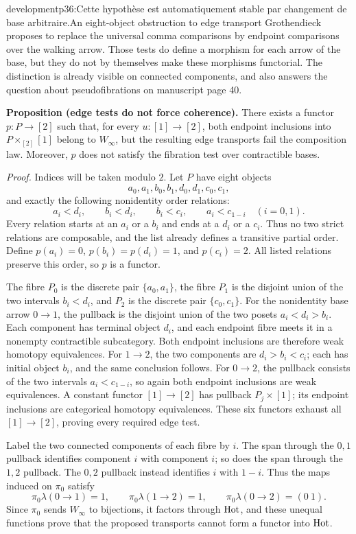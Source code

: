 \begin{dcomment}{development}{p36:Cette hypothèse est automatiquement stable par changement de base arbitraire.}{An eight-object obstruction to edge transport}
Grothendieck proposes to replace the universal comma comparisons by endpoint comparisons over the walking arrow. Those tests do define a morphism for each arrow of the base, but they do not by themselves make these morphisms functorial. The distinction is already visible on connected components, and also answers the question about pseudofibrations on manuscript page 40.

\textbf{Proposition (edge tests do not force coherence).}\ours
There exists a functor $p:P\to[2]$ such that, for every $u:[1]\to[2]$, both endpoint inclusions into $P\times_{[2]}[1]$ belong to $W_\infty$, but the resulting edge transports fail the composition law. Moreover, $p$ does not satisfy the fibration test over contractible bases.

\emph{Proof.} Indices will be taken modulo $2$. Let $P$ have eight objects
\[
 a_0,a_1,b_0,b_1,d_0,d_1,c_0,c_1,
\]
and exactly the following nonidentity order relations:
\[
 a_i<d_i,\qquad b_i<d_i,\qquad
 b_i<c_i,\qquad a_i<c_{1-i}\quad(i=0,1).
\]
Every relation starts at an $a_i$ or a $b_i$ and ends at a $d_i$ or a $c_i$. Thus no two strict relations are composable, and the list already defines a transitive partial order. Define $p(a_i)=0$, $p(b_i)=p(d_i)=1$, and $p(c_i)=2$. All listed relations preserve this order, so $p$ is a functor.

The fibre $P_0$ is the discrete pair $\{a_0,a_1\}$, the fibre $P_1$ is the disjoint union of the two intervals $b_i<d_i$, and $P_2$ is the discrete pair $\{c_0,c_1\}$. For the nonidentity base arrow $0\to1$, the pullback is the disjoint union of the two posets $a_i<d_i>b_i$. Each component has terminal object $d_i$, and each endpoint fibre meets it in a nonempty contractible subcategory. Both endpoint inclusions are therefore weak homotopy equivalences. For $1\to2$, the two components are $d_i>b_i<c_i$; each has initial object $b_i$, and the same conclusion follows. For $0\to2$, the pullback consists of the two intervals $a_i<c_{1-i}$, so again both endpoint inclusions are weak equivalences. A constant functor $[1]\to[2]$ has pullback $P_j\times[1]$; its endpoint inclusions are categorical homotopy equivalences. These six functors exhaust all $[1]\to[2]$, proving every required edge test.

Label the two connected components of each fibre by $i$. The span through the $0,1$ pullback identifies component $i$ with component $i$; so does the span through the $1,2$ pullback. The $0,2$ pullback instead identifies $i$ with $1-i$. Thus the maps induced on $\pi_0$ satisfy
\[
 \pi_0\lambda(0\to1)=1,\qquad
 \pi_0\lambda(1\to2)=1,\qquad
 \pi_0\lambda(0\to2)=(0\ 1).
\]
Since $\pi_0$ sends $W_\infty$ to bijections, it factors through $\mathrm{Hot}$, and these unequal functions prove that the proposed transports cannot form a functor into $\mathrm{Hot}$.


\end{dcomment}
